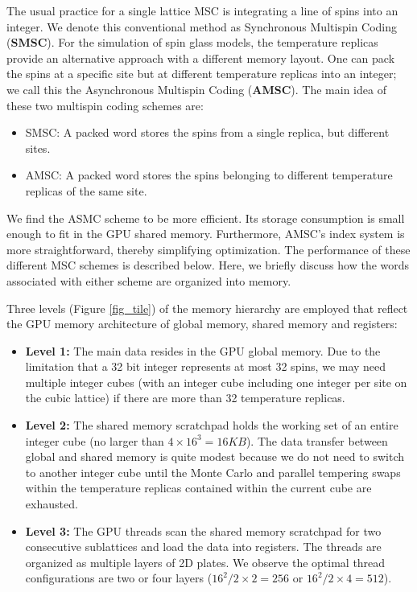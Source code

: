 The usual practice for a single lattice MSC is integrating a line of
spins into an integer. We denote this conventional method as
Synchronous Multispin Coding ({\bf SMSC}). For the simulation of spin
glass models, the temperature replicas provide an alternative approach
with a different memory layout.  One can pack the spins at a
specific site but at different temperature replicas into an integer;
we call this the Asynchronous Multispin Coding ({\bf AMSC}). The main
idea of these two multispin coding schemes are:
\begin{itemize}
\item {SMSC}: A packed word stores the spins from a single replica, but
  different sites.
\item {AMSC}: A packed word stores the spins belonging to different
  temperature replicas of the same site.
\end{itemize}
We find the ASMC scheme to be more efficient. Its storage consumption
is small enough to fit in the GPU shared memory. Furthermore, AMSC's
index system is more straightforward, thereby simplifying
optimization.  The performance of these different MSC schemes is
described below.  Here, we briefly discuss how the words
associated with either scheme are organized into memory.

Three levels (Figure \ref{fig_tile}) of the memory hierarchy are employed
that reflect the GPU memory architecture of global memory, shared
memory and registers:
\begin{itemize}
\item {\bf Level 1:} The main data resides in the GPU global
  memory. Due to the limitation that a 32 bit integer represents at
  most 32 spins, we may need multiple integer cubes (with an integer
  cube including one integer per site on the cubic lattice) if there
  are more than 32 temperature replicas.

\item {\bf Level 2:} The shared memory scratchpad holds the working
  set of an entire integer cube (no larger than $4 \times 16^3 =
  16KB$).  The data transfer between global and shared memory is quite
  modest because we do not need to switch to another integer cube
  until the Monte Carlo and parallel tempering swaps within the
  temperature replicas contained within the current cube are
  exhausted.

\item {\bf Level 3:} The GPU threads scan the shared memory scratchpad
  for two consecutive sublattices and load the data into
  registers. The threads are organized as multiple layers of 2D
  plates.  We observe the optimal thread configurations are two or
  four layers ($16^2/2 \times 2 = 256$ or $16^2/2 \times 4 = 512$).
\end{itemize}

